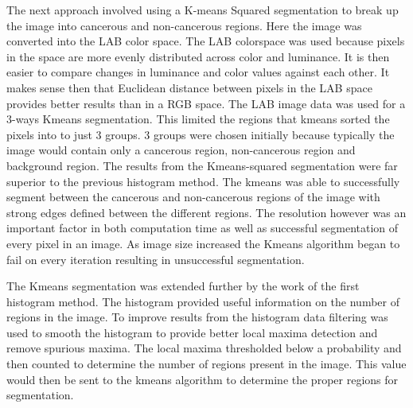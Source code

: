 \documentclass[a4paper,10pt,oneside]{article}
\begin{document}
The next approach involved using a K-means Squared segmentation to break up the image into cancerous and non-cancerous regions. Here the image was converted into the LAB color space. The LAB colorspace was used because pixels in the space are more evenly distributed across color and luminance. It is then easier to compare changes in luminance and color values against each other. It makes sense then that Euclidean distance between pixels in the LAB space provides better results than in a RGB space. The LAB image data was used for a 3-ways Kmeans segmentation. This limited the regions that kmeans sorted the pixels into to just 3 groups. 3 groups were chosen initially because typically the image would contain only a cancerous region, non-cancerous region and background region. The results from the Kmeans-squared segmentation were far superior to the previous histogram method. The kmeans was able to successfully segment between the cancerous and non-cancerous regions of the image with strong edges defined between the different regions. The resolution however was an important factor in both computation time as well as successful segmentation of every pixel in an image. As image size increased the Kmeans algorithm began to fail on every iteration resulting in unsuccessful segmentation.


The Kmeans segmentation was extended further by the work of the first histogram method. The histogram provided useful information on the number of regions in the image. To improve results from the histogram data filtering was used to smooth the histogram to provide better local maxima detection and remove spurious maxima. The local maxima thresholded below a probability and then counted to determine the number of regions present in the image. This value would then be sent to the kmeans algorithm to determine the proper regions for segmentation.


\end{document}
